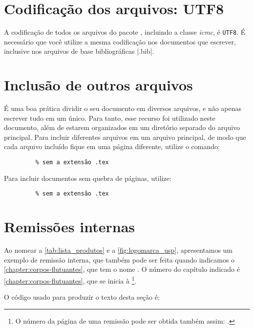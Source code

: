 
\section{Codificação dos arquivos: UTF8}

A codificação de todos os arquivos do pacote \abnTeX, incluindo a classe \textit{icmc}, é \texttt{UTF8}. É necessário que
você utilize a mesma codificação nos documentos que escrever, inclusive nos
arquivos de base bibliográficas |.bib|.



\section{Inclusão de outros arquivos}\label{sec-include}

É uma boa prática dividir o seu documento em diversos arquivos, e não
apenas escrever tudo em um único. Para tanto, esse recurso foi utilizado neste
documento, além de estarem organizados em um diretório separado do arquivo principal. Para incluir diferentes arquivos em um arquivo principal,
de modo que cada arquivo incluído fique em uma página diferente, utilize o
comando:

\begin{verbatim}
         % sem a extensão .tex
\end{verbatim}

Para incluir documentos sem quebra de páginas, utilize:

\begin{verbatim}
         % sem a extensão .tex
\end{verbatim}



\section{Remissões internas}

Ao nomear a \autoref{tab:lista_produtos} e a \autoref{fig:logomarca_usp}, apresentamos um exemplo de remissão interna, que também pode ser feita quando indicamos o \autoref{chapter:corpos-flutuantes}, que tem o nome \emph{}. O número do capítulo indicado é \ref{chapter:corpos-flutuantes}, que se inicia à \footnote{O número da página de uma remissão pode ser obtida também assim:
\pageref{chapter:corpos-flutuantes}.}.

O código usado para produzir o texto desta seção é:

